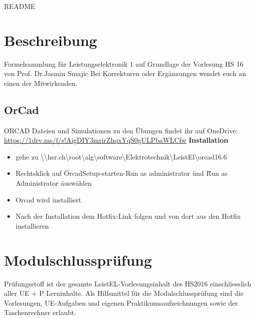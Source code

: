\thispagestyle{empty}
\setcounter{page}{0} %
{\huge README }
\section*{Beschreibung}
Formelsammlung für Leistungselektronik 1 auf Grundlage der Vorlesung HS 16 von Prof. Dr.Jasmin Smajic \newline
Bei Korrekturen oder Ergänzungen wendet euch an einen der Mitwirkenden.
\subsection*{OrCad}
ORCAD Dateien und Simulationen zu den Übungen findet ihr auf OneDrive: \newline
\url{https://1drv.ms/f/s!AigDIY3mrirZhqxYqS0gULPbaWLCfw}\newline
\textbf{Installation}\newline
\begin{itemize}
    \item gehe zu  \textbackslash\textbackslash hsr.ch\textbackslash root\textbackslash alg\textbackslash software\textbackslash Elektrotechnik\textbackslash LeistEl\textbackslash orcad16.6
    \item Rechtsklick auf \" OrcadSetup-starten-Run as administrator \" und \" Run as Administrator \" auswählen
    \item Orcad wird installiert
    \item Nach der Installation dem Hotfix-Link folgen und von dort aus den Hotfix installieren
\end{itemize}

\section*{Modulschlussprüfung}
Prüfungsstoff ist der gesamte LeistEL-Vorlesungsinhalt des HS2016 einschliesslich aller UE + P Lerninhalte.\newline
Als Hilfsmittel für die Modulschlussprüfung sind die Vorlesungen,\newline
UE-Aufgaben und eigenen Praktikumsaufzeichnungen sowie der Taschenrechner erlaubt.

